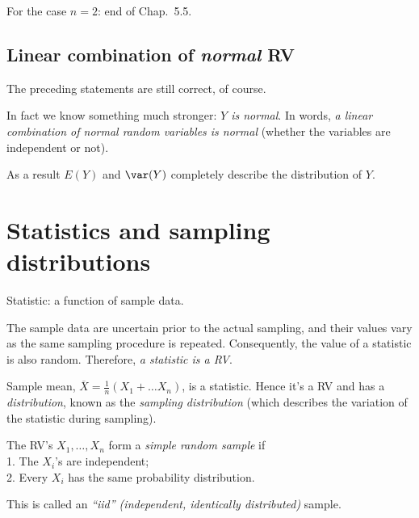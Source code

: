 \documentclass[12pt]{article}
\begin{document}
\alert[Proof]%
For the case $n = 2$: end of Chap.~5.5.

\subsection{Linear combination of \emph{normal} RV}

The preceding statements are still correct, of course.

In fact we know something much stronger:
\emph{$Y$ is normal}. In words,
\emph{a linear combination of normal random variables is normal}
(whether the variables are independent or not).

As a result $E(Y)$ and $\var(Y)$ completely describe the distribution
of $Y$.

\section{Statistics and sampling distributions}

\alert[Definition]%
Statistic: a function of sample data.

The sample data are uncertain prior to the actual sampling,
and their values vary as the same sampling procedure is repeated.
Consequently, the value of a statistic is also random.
Therefore,
\emph{a statistic is a RV}.

\example Sample mean,
$\overline{X} = \frac{1}{n}(X_1 + \dotsc X_n)$,
is a statistic. Hence it's a RV and has a \emph{distribution},
known as the \emph{sampling distribution}
(which describes the variation of the statistic during sampling).

\alert[Definition]%
The RV's $X_1,\dotsc,X_n$ form a \emph{simple random sample} if\\
1. The $X_i$'s are independent;\\
2. Every $X_i$ has the same probability distribution.

This is called an \emph{``iid'' (independent, identically distributed)}
sample.


% 
% 
% 
% 
\end{document}

